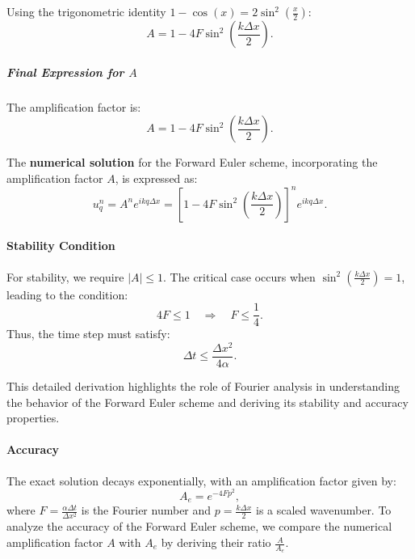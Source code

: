 \documentclass{article}
\begin{document}
			Using the trigonometric identity \( 1 - \cos(x) = 2 \sin^2\left(\frac{x}{2}\right) \):
			\[
			A = 1 - 4F \sin^2\left(\frac{k \Delta x}{2}\right).
			\]
			
			\subparagraph{Final Expression for \( A \)}
			The amplification factor is:
			\[
			A = 1 - 4F \sin^2\left(\frac{k \Delta x}{2}\right).
			\]
			
			The \textbf{numerical solution} for the Forward Euler scheme, incorporating the amplification factor \( A \), is expressed as:
			\[
			u_q^{n} = A^n e^{i k q \Delta x} = \left[1 - 4F \sin^2\left(\frac{k \Delta x}{2}\right)\right]^n e^{i k q \Delta x}.
			\]
			

			
			\paragraph{Stability Condition}
			For stability, we require \( |A| \leq 1 \). The critical case occurs when \( \sin^2\left(\frac{k \Delta x}{2}\right) = 1 \), leading to the condition:
			\[
			4F \leq 1 \quad \Rightarrow \quad F \leq \frac{1}{4}.
			\]
			Thus, the time step must satisfy:
			\[
			\Delta t \leq \frac{\Delta x^2}{4 \alpha}.
			\]
			
			This detailed derivation highlights the role of Fourier analysis in understanding the behavior of the Forward Euler scheme and deriving its stability and accuracy properties.
			
			\paragraph{Accuracy}
			
			The exact solution decays exponentially, with an amplification factor given by:
			\[
			A_e = e^{-4Fp^2},
			\]
			where \( F = \frac{\alpha \Delta t}{\Delta x^2} \) is the Fourier number and \( p = \frac{k \Delta x}{2} \) is a scaled wavenumber. To analyze the accuracy of the Forward Euler scheme, we compare the numerical amplification factor \( A \) with \( A_e \) by deriving their ratio \( \frac{A}{A_e} \).
			
\end{document}

